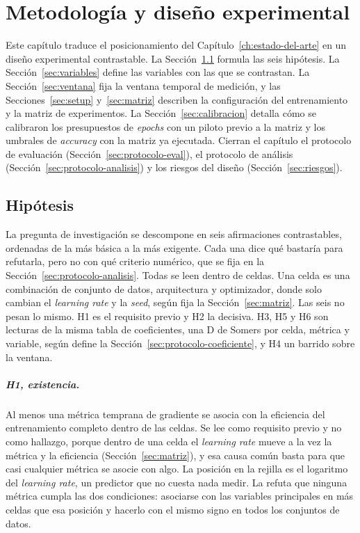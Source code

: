 \chapter{Metodología y diseño experimental}
\label{ch:metodologia}

Este capítulo traduce el posicionamiento del Capítulo~\ref{ch:estado-del-arte} en un diseño experimental contrastable. La Sección~\ref{sec:hipotesis} formula las seis hipótesis. La Sección~\ref{sec:variables} define las variables con las que se contrastan. La Sección~\ref{sec:ventana} fija la ventana temporal de medición, y las Secciones~\ref{sec:setup} y~\ref{sec:matriz} describen la configuración del entrenamiento y la matriz de experimentos. La Sección~\ref{sec:calibracion} detalla cómo se calibraron los presupuestos de \emph{epochs} con un piloto previo a la matriz y los umbrales de \emph{accuracy} con la matriz ya ejecutada. Cierran el capítulo el protocolo de evaluación (Sección~\ref{sec:protocolo-eval}), el protocolo de análisis (Sección~\ref{sec:protocolo-analisis}) y los riesgos del diseño (Sección~\ref{sec:riesgos}).

\section{Hipótesis}
\label{sec:hipotesis}

La pregunta de investigación se descompone en seis afirmaciones contrastables, ordenadas de la más básica a la más exigente. Cada una dice qué bastaría para refutarla, pero no con qué criterio numérico, que se fija en la Sección~\ref{sec:protocolo-analisis}. Todas se leen dentro de celdas. Una celda es una combinación de conjunto de datos, arquitectura y optimizador, donde solo cambian el \emph{learning rate} y la \emph{seed}, según fija la Sección~\ref{sec:matriz}. Las seis no pesan lo mismo. H1 es el requisito previo y H2 la decisiva. H3, H5 y H6 son lecturas de la misma tabla de coeficientes, una D de Somers por celda, métrica y variable, según define la Sección~\ref{sec:protocolo-coeficiente}, y H4 un barrido sobre la ventana.

\paragraph{H1, existencia.} Al menos una métrica temprana de gradiente se asocia con la eficiencia del entrenamiento completo dentro de las celdas. Se lee como requisito previo y no como hallazgo, porque dentro de una celda el \emph{learning rate} mueve a la vez la métrica y la eficiencia (Sección~\ref{sec:matriz}), y esa causa común basta para que casi cualquier métrica se asocie con algo. La posición en la rejilla es el logaritmo del \emph{learning rate}, un predictor que no cuesta nada medir. La refuta que ninguna métrica cumpla las dos condiciones: asociarse con las variables principales en más celdas que esa posición y hacerlo con el mismo signo en todos los conjuntos de datos.

